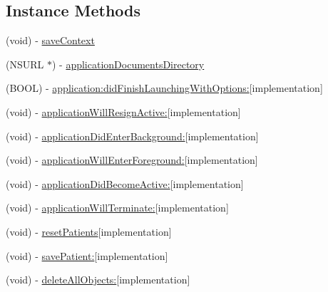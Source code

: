 \subsection*{Instance Methods}
\begin{DoxyCompactItemize}
\item 
(void) -\/ \hyperlink{interface_app_delegate_affcb482ed45b506b0659be7277e805f9}{save\+Context}
\item 
(N\+S\+U\+R\+L $\ast$) -\/ \hyperlink{interface_app_delegate_a09e82eab31a341400477030e8b474b13}{application\+Documents\+Directory}
\item 
(B\+O\+O\+L) -\/ \hyperlink{interface_app_delegate_a0eeb7690788c7164f03af6252048d198}{application\+:did\+Finish\+Launching\+With\+Options\+:}{\ttfamily  \mbox{[}implementation\mbox{]}}
\item 
(void) -\/ \hyperlink{interface_app_delegate_ad4e9549671ce8c4fc31bd6e4836b5a91}{application\+Will\+Resign\+Active\+:}{\ttfamily  \mbox{[}implementation\mbox{]}}
\item 
(void) -\/ \hyperlink{interface_app_delegate_a26d9be79224184ef974a09c1793eb360}{application\+Did\+Enter\+Background\+:}{\ttfamily  \mbox{[}implementation\mbox{]}}
\item 
(void) -\/ \hyperlink{interface_app_delegate_ad9916739a43349edad2877110be31059}{application\+Will\+Enter\+Foreground\+:}{\ttfamily  \mbox{[}implementation\mbox{]}}
\item 
(void) -\/ \hyperlink{interface_app_delegate_a73aa814398c205f47f21ed59b616e492}{application\+Did\+Become\+Active\+:}{\ttfamily  \mbox{[}implementation\mbox{]}}
\item 
(void) -\/ \hyperlink{interface_app_delegate_ae08d55e0d58680354fceb7c8341055eb}{application\+Will\+Terminate\+:}{\ttfamily  \mbox{[}implementation\mbox{]}}
\item 
(void) -\/ \hyperlink{interface_app_delegate_ace75f70e22c54ded995fc3d6b2b1aef8}{reset\+Patients}{\ttfamily  \mbox{[}implementation\mbox{]}}
\item 
(void) -\/ \hyperlink{interface_app_delegate_a882e53c73c2ad28f263f8321e85550d7}{save\+Patient\+:}{\ttfamily  \mbox{[}implementation\mbox{]}}
\item 
(void) -\/ \hyperlink{interface_app_delegate_ae4dd9162700124ad5d2ee447309b08eb}{delete\+All\+Objects\+:}{\ttfamily  \mbox{[}implementation\mbox{]}}
\end{DoxyCompactItemize}
